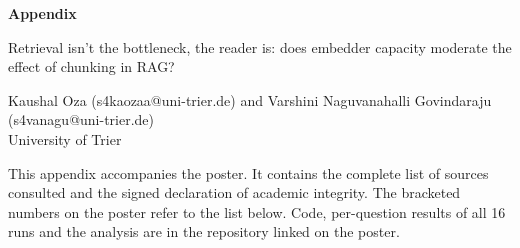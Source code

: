 \documentclass[10pt]{article}
\begin{document}
\RaggedRight

{\color{navy}\LARGE\bfseries Appendix\par}
\vspace{2mm}
{\large Retrieval isn't the bottleneck, the reader is: does embedder capacity
moderate the effect of chunking in RAG?\par}
\vspace{3mm}
Kaushal Oza (s4kaozaa@uni-trier.de) and
Varshini Naguvanahalli Govindaraju (s4vanagu@uni-trier.de)\\
University of Trier

\vspace{6mm}
This appendix accompanies the poster. It contains the complete list of
sources consulted and the signed declaration of academic integrity. The
bracketed numbers on the poster refer to the list below. Code, per-question
results of all 16 runs and the analysis are in the repository linked on the
poster.

\renewcommand{\refname}{References}
\nocite{*}



\clearpage
{}
\end{document}
